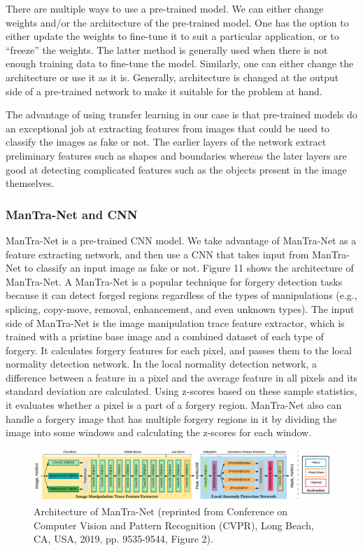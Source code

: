 \documentclass[11pt]{article}
\begin{document}
There are multiple ways to use a pre-trained model. We can either change weights and/or the architecture of the pre-trained model. One has the option to either update the weights to fine-tune it to suit a particular application, or to “freeze” the weights. The latter method is generally used when there is not enough training data to fine-tune the model. Similarly, one can either change the architecture or use it as it is. Generally, architecture is changed at the output side of a pre-trained network to make it suitable for the problem at hand.

The advantage of using transfer learning in our case is that pre-trained models do an exceptional job at extracting features from images that could be used to classify the images as fake or not. The earlier layers of the network extract preliminary features such as shapes and boundaries whereas the later layers are good at detecting complicated features such as the objects present in the image themselves.

\subsubsection{ManTra-Net and CNN}

ManTra-Net is a pre-trained CNN model. We take advantage of ManTra-Net as a feature extracting network, and then use a CNN that takes input from ManTra-Net to classify an input image as fake or not. Figure 11 shows the architecture of ManTra-Net. A ManTra-Net is a popular technique for forgery detection tasks because it can detect forged regions regardless of the types of manipulations (e.g., splicing, copy-move, removal, enhancement, and even unknown types). The input side of ManTra-Net is the image manipulation trace feature extractor, which is trained with a pristine base image and a combined dataset of each type of forgery.  It calculates forgery features for each pixel, and passes them to the local normality detection network. In the local normality detection network, a difference between a feature in a pixel and the average feature in all pixels and its standard deviation are calculated. Using z-scores based on these sample statistics, it evaluates whether a pixel is a part of a forgery region. ManTra-Net also can handle a forgery image that has multiple forgery regions in it by dividing the image into some windows and calculating the z-scores for each window.

\begin{figure}[!htb]
    \centering
        \includegraphics[scale=.28]{figures/figure_5.png}
    \caption{Architecture of ManTra-Net (reprinted from Conference on Computer Vision and Pattern Recognition (CVPR), Long Beach, CA, USA, 2019, pp. 9535-9544, Figure 2).}
    \label{fig:11}
\end{figure}
\end{document}
